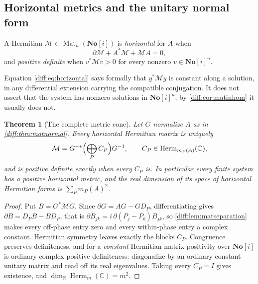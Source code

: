 \documentclass[11pt,letterpaper]{article}
\numberwithin{equation}{section}
\newtheorem{theorem}{Theorem}[section]
\theoremstyle{definition}
\theoremstyle{remark}
\newcommand{\SC}{\mathbf{No}[i]}
\newcommand{\R}{\mathbb R}
\newcommand{\C}{\mathbb C}
\newcommand{\der}{\partial}
\newcommand{\Mat}{\operatorname{Mat}}
\newcommand{\Herm}{\operatorname{Herm}}
\begin{document}
\subsection{Horizontal metrics and the unitary normal form}
\label{diff:sub:matmetrics}

\begin{definition}
\label{diff:def:horizontal}
A Hermitian $\mathcal M\in\Mat_{n}(\SC)$ is \emph{horizontal} for $A$ when
\begin{equation}\label{diff:eq:horizontal}
 \der\mathcal M+A^{*}\mathcal M+\mathcal M A=0 ,
\end{equation}
and \emph{positive definite} when $v^{*}\mathcal M v>0$ for every nonzero
$v\in\SC^{n}$.
\end{definition}

Equation \cref{diff:eq:horizontal} says formally that $y^{*}\mathcal M y$ is
constant along a solution, in any differential extension carrying the
compatible conjugation. It does not assert that the system has nonzero
solutions in $\SC^{n}$; by \cref{diff:cor:matinhom} it usually does not.

\begin{theorem}[The complete metric cone]
\label{diff:thm:matmetric}
Let $G$ normalize $A$ as in \cref{diff:thm:matnormal}. Every horizontal
Hermitian matrix is uniquely
\begin{equation}\label{diff:eq:matmetriccone}
 \mathcal M=G^{-*}\Bigl(\bigoplus_{P}C_{P}\Bigr)G^{-1},
 \qquad C_{P}\in\Herm_{m_{P}(A)}(\C),
\end{equation}
and is positive definite exactly when every $C_{P}$ is. In particular every
finite system has a positive horizontal metric, and the real dimension of its
space of horizontal Hermitian forms is $\sum_{P}m_{P}(A)^{2}$.
\end{theorem}
\begin{proof}
Put $B=G^{*}\mathcal M G$. Since $\der G=AG-GD_{P}$, differentiating gives
$\der B=D_{P}B-BD_{P}$, that is
$\der B_{jk}=i\,\der(P_{j}-P_{k})B_{jk}$, so
\cref{diff:lem:matseparation} makes every off-phase entry zero and every
within-phase entry a complex constant. Hermitian symmetry leaves exactly the
blocks $C_{P}$. Congruence preserves definiteness, and for a \emph{constant}
Hermitian matrix positivity over $\SC$ is ordinary complex positive
definiteness: diagonalize by an ordinary constant unitary matrix and read off
its real eigenvalues. Taking every $C_{P}=I$ gives existence, and
$\dim_{\R}\Herm_{m}(\C)=m^{2}$.
\end{proof}
\end{document}
